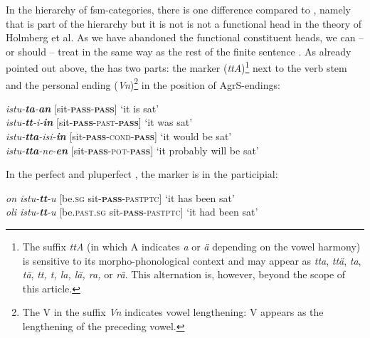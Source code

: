 \documentclass[output=paper]{langsci/langscibook}
\begin{document}
In the hierarchy of fsm-categories, there is one difference compared to \citet{HolmbergEtAl1993}, namely that  is part of the hierarchy but it is not is not a functional head in the theory of Holmberg et al.  As we have abandoned the functional constituent heads, we can – or should – treat  in the same way as the rest of the finite sentence . As already pointed out above, the   has two parts: the  marker (\textit{ttA})\footnote{The suffix \textit{ttA} (in which A indicates \textit{a} or \textit{ä} depending on the vowel harmony) is sensitive to its morpho-phonological context and may appear as \textit{tta}, \textit{ttä}, \textit{ta}, \textit{tä}, \textit{tt, t, la, lä, ra,} or \textit{rä}. This alternation is, however, beyond the scope of this article.} next to the verb stem and the  personal ending (\textit{Vn})\footnote{The V in the suffix \textit{Vn} indicates vowel lengthening: V appears as the lengthening of the preceding vowel.}  in the position of AgrS-endings:

\ea%
\label{ex:nikanne:13} 
\textit{istu-}\textbf{\textit{ta}}\textit{{}-}\textbf{\textit{an}} [sit-\textbf{\textsc{pass}}{}-\textbf{\textsc{pass}}] ‘it is sat’\\
\textit{istu-}\textbf{\textit{tt}}\textit{{}-i-}\textbf{\textit{in}} [sit-\textbf{\textsc{pass}}{}-\textsc{past}-\textbf{\textsc{pass}}] ‘it was sat’\\
\textit{istu-}\textbf{\textit{tta}}\textit{{}-isi-}\textbf{\textit{in}} [sit-\textbf{\textsc{pass}}{}-\textsc{cond}-\textbf{\textsc{pass}}] `it would be sat’\\
\textit{istu-}\textbf{\textit{tta}}\textit{{}-ne-}\textbf{\textit{en}}  [sit-\textbf{\textsc{pass}}{}-\textsc{pot}-\textbf{\textsc{pass}}] `it probably will be sat’\\
\z

In the perfect and pluperfect , the  marker is in the participial:

\ea%
\label{ex:nikanne:12} 
\textit{on istu-}\textbf{\textit{tt}}\textit{{}-u}   [be.\textsc{sg} sit-\textbf{\textsc{pass}}{}-\textsc{past}\textsc{ptc}]  ‘it has been sat’\\
\textit{oli istu-}\textbf{\textit{tt}}\textit{{}-u}   [be.\textsc{past}.\textsc{sg} sit-\textbf{\textsc{pass}}{}-\textsc{past}\textsc{ptc}] ‘it had been sat’
\z
\end{document}

